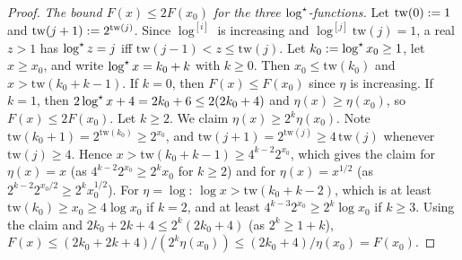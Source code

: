 \begin{proof}
\emph{The bound $F(x)\le2F(x_0)$ for the three $\log^{\star}$-functions.} Let
$\mathrm{tw}(0)\mathrel{:=}1$ and $\mathrm{tw}(j+1)\mathrel{:=}2^{\mathrm{tw}(j)}$. Since
$\log^{[i]}$ is increasing and $\log^{[j]}\mathrm{tw}(j)=1$, a real $z>1$ has
$\log^{\star} z=j$ iff $\mathrm{tw}(j-1)<z\le\mathrm{tw}(j)$. Let $k_0\mathrel{:=}\log^{\star} x_0\ge
1$, let $x\ge x_0$, and write $\log^{\star} x=k_0+k$ with $k\ge0$. Then $x_0\le
\mathrm{tw}(k_0)$ and $x>\mathrm{tw}(k_0+k-1)$. If $k=0$, then $F(x)\le F(x_0)$
since $\eta$ is increasing. If $k=1$, then $2\log^{\star} x+4=2k_0+6\le2(2k_0+4)$ and
$\eta(x)\ge\eta(x_0)$, so $F(x)\le2F(x_0)$. Let $k\ge2$. We claim
$\eta(x)\ge2^k\eta(x_0)$. Note $\mathrm{tw}(k_0+1)=2^{\mathrm{tw}(k_0)}\ge2^{x_0}$,
and $\mathrm{tw}(j+1)=2^{\mathrm{tw}(j)}\ge4\,\mathrm{tw}(j)$ whenever
$\mathrm{tw}(j)\ge4$. Hence $x>\mathrm{tw}(k_0+k-1)\ge4^{k-2}2^{x_0}$, which gives
the claim for $\eta(x)=x$ (as $4^{k-2}2^{x_0}\ge2^kx_0$ for $k\ge2$) and for
$\eta(x)=x^{1/2}$ (as $2^{k-2}2^{x_0/2}\ge2^kx_0^{1/2}$). For
$\eta=\log$: $\log x>\mathrm{tw}(k_0+k-2)$, which is at least $\mathrm{tw}(k_0)\ge
x_0\ge4\log x_0$ if $k=2$, and at least $4^{k-3}2^{x_0}\ge2^k\log x_0$ if
$k\ge3$. Using the claim and $2k_0+2k+4\le2^k(2k_0+4)$ (as $2^k\ge1+k$),
$F(x)\le(2k_0+2k+4)/(2^k\eta(x_0))\le(2k_0+4)/\eta(x_0)=F(x_0)$.
\end{proof}

